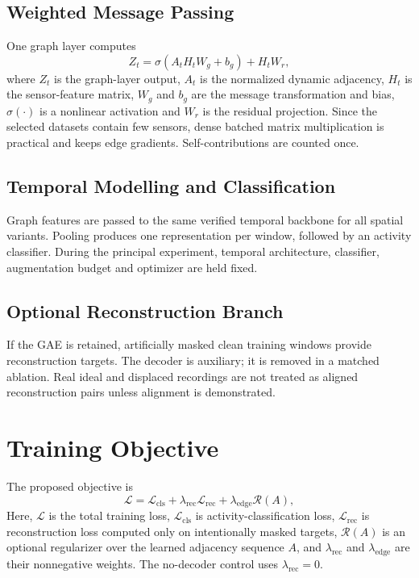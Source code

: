 \documentclass[12pt,a4paper,twoside,openright]{report}
\begin{document}
\subsection{Weighted Message Passing}
One graph layer computes
\[
Z_t=\sigma\!\left(A_tH_tW_g+b_g\right)+H_tW_r,
\]
where $Z_t$ is the graph-layer output, $A_t$ is the normalized dynamic adjacency, $H_t$ is the sensor-feature matrix, $W_g$ and $b_g$ are the message transformation and bias, $\sigma(\cdot)$ is a nonlinear activation and $W_r$ is the residual projection. Since the selected datasets contain few sensors, dense batched matrix multiplication is practical and keeps edge gradients. Self-contributions are counted once.

\subsection{Temporal Modelling and Classification}
Graph features are passed to the same verified temporal backbone for all spatial variants. Pooling produces one representation per window, followed by an activity classifier. During the principal experiment, temporal architecture, classifier, augmentation budget and optimizer are held fixed.

\subsection{Optional Reconstruction Branch}
If the GAE is retained, artificially masked clean training windows provide reconstruction targets. The decoder is auxiliary; it is removed in a matched ablation. Real ideal and displaced recordings are not treated as aligned reconstruction pairs unless alignment is demonstrated.

\section{Training Objective}
The proposed objective is
\[
\mathcal L=
\mathcal L_{\mathrm{cls}}
+\lambda_{\mathrm{rec}}\mathcal L_{\mathrm{rec}}
+\lambda_{\mathrm{edge}}\mathcal R(A),
\]
Here, $\mathcal L$ is the total training loss, $\mathcal L_{\mathrm{cls}}$ is activity-classification loss, $\mathcal L_{\mathrm{rec}}$ is reconstruction loss computed only on intentionally masked targets, $\mathcal R(A)$ is an optional regularizer over the learned adjacency sequence $A$, and $\lambda_{\mathrm{rec}}$ and $\lambda_{\mathrm{edge}}$ are their nonnegative weights. The no-decoder control uses $\lambda_{\mathrm{rec}}=0$.
\end{document}
